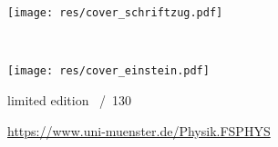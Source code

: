\begin{titlepage}
	\begin{center}
		\vspace*{-1.25cm}
		{\LARGE
		\fibeltitel\par}

		\vspace{0.5cm}
		\texttt{[image: res/cover\_schriftzug.pdf]}

		{\huge
		\fibelsemester~\fibeljahr}

		\vspace{0.5cm}
		\texttt{[image: res/cover\_einstein.pdf]}
	\end{center}

	\LARGE
	limited edition \underline{\fontsize{32pt}{1em}}~/~130
	
	\vspace{1.9cm}
	\centering
	\url{https://www.uni-muenster.de/Physik.FSPHYS}
\end{titlepage}

